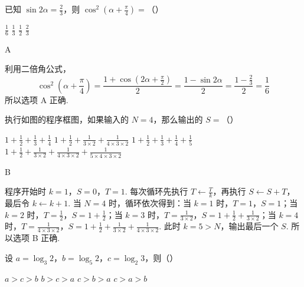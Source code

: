 \begin{problem}
已知 \(\sin 2\alpha = \frac{2}{3}\)，则 \(\cos^2\left(\alpha + \frac{\pi}{4}\right) =\)（\quad）

\choices
    {\(\frac{1}{6}\)}
    {\(\frac{1}{3}\)}
    {\(\frac{1}{2}\)}
    {\(\frac{2}{3}\)}
\end{problem}

\begin{answer}
A
\end{answer}

\begin{solution}
利用二倍角公式，
\[
\cos^2\left(\alpha+\frac{\pi}{4}\right)
=\frac{1+\cos\left(2\alpha+\frac{\pi}{2}\right)}{2}
=\frac{1-\sin2\alpha}{2}
=\frac{1-\frac23}{2}=\frac16
\]
所以选项 A 正确.
\end{solution}

\begin{problem}
执行如图的程序框图，如果输入的 \(N = 4\)，那么输出的 \(S =\)（\quad）


\choices
    {\(1 + \frac{1}{2} +\frac{1}{3} +\frac{1}{4}\)}
    {\(1 + \frac{1}{2} +\frac{1}{3\times 2} +\frac{1}{4\times 3\times 2}\)}
    {\(1 + \frac{1}{2} +\frac{1}{3} +\frac{1}{4} +\frac{1}{5}\)}
    {\(1 + \frac{1}{2} +\frac{1}{3\times 2} +\frac{1}{4\times 3\times 2} +\frac{1}{5\times 4\times 3\times 2}\)}
\end{problem}

\begin{answer}
B
\end{answer}

\begin{solution}
程序开始时 \(k=1\)，\(S=0\)，\(T=1\). 每次循环先执行 \(T\leftarrow \frac{T}{k}\)，再执行 \(S\leftarrow S+T\)，最后令 \(k\leftarrow k+1\). 当 \(N=4\) 时，循环依次得到：当 \(k=1\) 时，\(T=1\)，\(S=1\)；当 \(k=2\) 时，\(T=\frac12\)，\(S=1+\frac12\)；当 \(k=3\) 时，\(T=\frac{1}{3\times2}\)，\(S=1+\frac12+\frac{1}{3\times2}\)；当 \(k=4\) 时，\(T=\frac{1}{4\times3\times2}\)，\(S=1+\frac12+\frac{1}{3\times2}+\frac{1}{4\times3\times2}\).
此时 \(k=5>N\)，输出最后一个 \(S\). 所以选项 B 正确.
\end{solution}

\begin{problem}
设 \(a = \log_{3} 2\)，\(b = \log_{5} 2\)，\(c = \log_{2} 3\)，则（\quad）

\choices
    {\(a > c > b\)}
    {\(b > c > a\)}
    {\(c > b > a\)}
    {\(c > a > b\)}
\end{problem}

